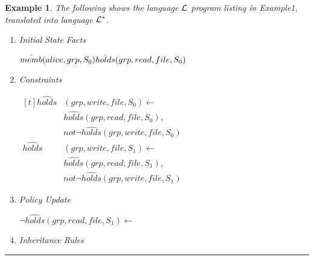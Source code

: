 \documentclass[10pt, twocolumn]{article}
\newtheorem{examp}{Example}
\newenvironment{example}{\begin{examp}\rm}{\rule{2mm}{2mm}\end{examp}}
\begin{document}
        \begin{example}
          The following shows the language ${\cal L}$ program listing in
          Example1,  translated into language ${\cal L}^{*}$.


          \begin{enumerate}
            \item
              Initial State Facts

              \begin{math}
                \hat{memb}(alice, grp, S_{0}) \\
                \hat{holds}(grp, read, file,S_{0})
              \end{math}

            \item
              Constraints

              \begin{math}
                  \begin{aligned}[t]
                    \hat{holds}&(grp, write, file, S_{0}) \leftarrow \\
                    & \hat{holds}(grp, read, file, S_{0}), \\
                    & not \lnot \hat{holds}(grp, write, file, S_{0}) \\
                    \hat{holds}&(grp, write, file, S_{1}) \leftarrow \\
                    & \hat{holds}(grp, read, file, S_{1}), \\
                    & not \lnot \hat{holds}(grp, write, file, S_{1})
                  \end{aligned}
              \end{math}

            \item
              Policy Update

              \begin{math}
                \lnot \hat{holds}(grp, read, file, S_{1}) \leftarrow
              \end{math}

            \item
              Inheritance Rules


\end{enumerate}
\end{example}
\end{document}
